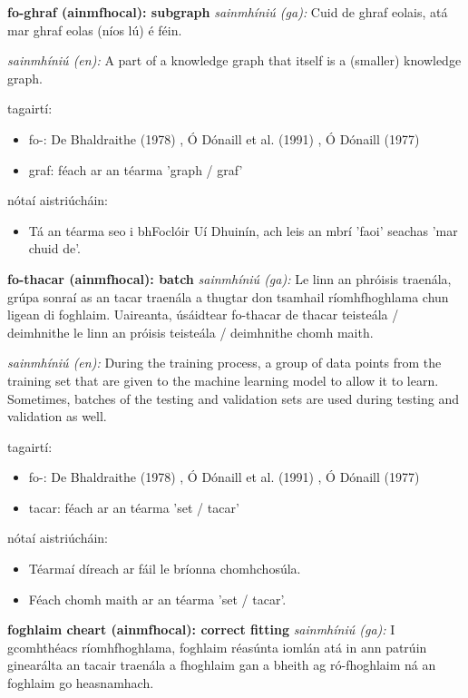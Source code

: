 \documentclass{article}
\begin{document}
\textbf{fo-ghraf (ainmfhocal): subgraph}
\textit{sainmhíniú (ga):} Cuid de ghraf eolais, atá mar ghraf eolas (níos lú) é féin.

\textit{sainmhíniú (en):} A part of a knowledge graph that itself is a (smaller) knowledge graph.

tagairtí:
\begin{itemize}
	\item fo-: De Bhaldraithe (1978) \cite{de-bhaldraithe}, Ó Dónaill et al. (1991) \cite{focloir-beag}, Ó Dónaill (1977) \cite{odonaill}
	\item graf: féach ar an téarma 'graph / graf'
\end{itemize}

nótaí aistriúcháin:
\begin{itemize}
	\item Tá an téarma seo i bhFoclóir Uí Dhuinín, ach leis an mbrí 'faoi' seachas 'mar chuid de'.
\end{itemize}


\textbf{fo-thacar (ainmfhocal): batch}
\textit{sainmhíniú (ga):} Le linn an phróisis traenála, grúpa sonraí as an tacar traenála a thugtar don tsamhail ríomhfhoghlama chun ligean di foghlaim. Uaireanta, úsáidtear fo-thacar de thacar teisteála / deimhnithe le linn an próisis teisteála / deimhnithe chomh maith.

\textit{sainmhíniú (en):} During the training process, a group of data points from the training set that are given to the machine learning model to allow it to learn. Sometimes, batches of the testing and validation sets are used during testing and validation as well.

tagairtí:
\begin{itemize}
	\item fo-: De Bhaldraithe (1978) \cite{de-bhaldraithe}, Ó Dónaill et al. (1991) \cite{focloir-beag}, Ó Dónaill (1977) \cite{odonaill}
	\item tacar: féach ar an téarma 'set / tacar'
\end{itemize}

nótaí aistriúcháin:
\begin{itemize}
	\item Téarmaí díreach ar fáil le bríonna chomhchosúla.
	\item Féach chomh maith ar an téarma 'set / tacar'.
\end{itemize}


\textbf{foghlaim cheart (ainmfhocal): correct fitting}
\textit{sainmhíniú (ga):} I gcomhthéacs ríomhfhoghlama, foghlaim réasúnta iomlán atá in ann patrúin ginearálta an tacair traenála a fhoghlaim gan a bheith ag ró-fhoghlaim ná an foghlaim go heasnamhach.
\end{document}
